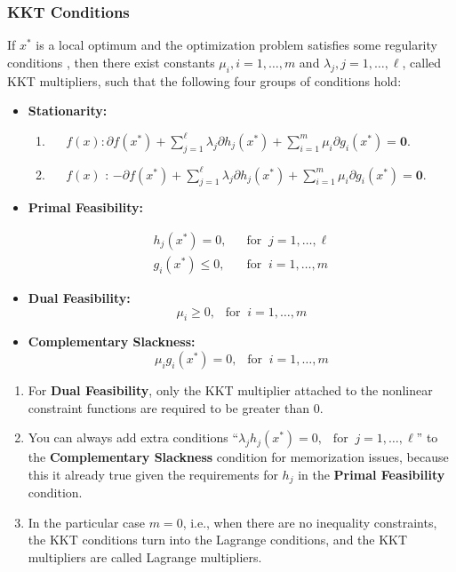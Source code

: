 \documentclass[13pt]{article}
\theoremstyle{definition}
\theoremstyle{remark}
\newenvironment{remark}
  {\pushQED{\qed}\renewcommand{\qedsymbol}{$\triangle$}\remarkx}
  {\popQED\endremarkx}
\begin{document}
\subsubsection{KKT Conditions}
If $x^*$ is a local optimum and the optimization problem satisfies some regularity conditions , then there exist constants $\mu_i, i=1, \ldots, m$ and $\lambda_j, j=1, \ldots, \ell$, called KKT multipliers, such that the following four groups of conditions hold:
\begin{itemize}
    \item \textbf{Stationarity:} 
    \begin{enumerate}[label=(\alph*)]
        \item {}~~  $f(x): \partial f\left(x^*\right)+\sum_{j=1}^{\ell} \lambda_j \partial h_j\left(x^*\right)+\sum_{i=1}^m \mu_i \partial g_i\left(x^*\right) = \mathbf{0}$.
        \item {}~~ $f(x)$ :
$
-\partial f\left(x^*\right)+\sum_{j=1}^{\ell} \lambda_j \partial h_j\left(x^*\right)+\sum_{i=1}^m \mu_i \partial g_i\left(x^*\right) = \mathbf{0}
$.
    \end{enumerate}
\item \textbf{Primal Feasibility:} 

$$
\begin{aligned}
h_j\left(x^*\right)  =0,~~ &\text { for } ~ j=1, \ldots, \ell \\
g_i\left(x^*\right)  \leq 0,~~ &\text { for } ~ i=1, \ldots, m
\end{aligned}
$$
\item \textbf{Dual Feasibility:} $$
\mu_i \geq 0,~~ \text { for } ~ i=1, \ldots, m
$$
\item \textbf{Complementary Slackness:} $$
\mu_i g_i\left(x^*\right)=0,~~ \text { for } ~ i=1, \ldots, m
$$
\end{itemize}

\begin{remark}\hfill
    \begin{enumerate}
        \item For \textbf{Dual Feasibility}, only the KKT multiplier attached to the nonlinear constraint functions are required to be greater than $0$.
        \item You can always add extra conditions ``$\lambda_j h_j\left(x^*\right)=0,~~ \text { for } ~ j=1, \ldots, \ell$'' to the \textbf{Complementary Slackness} condition for memorization issues, because this it already true given the requirements for $h_j$ in the \textbf{Primal Feasibility} condition.
        \item In the particular case $m=0$, i.e., when there are no inequality constraints, the KKT conditions turn into the Lagrange conditions, and the KKT multipliers are called Lagrange multipliers.
    \end{enumerate}
\end{remark}
\end{document}
